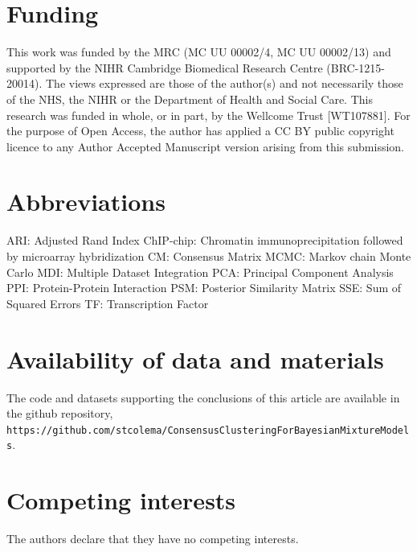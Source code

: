 \documentclass{bmcart}
\begin{document}
\begin{backmatter}
        
    \section*{Funding}%
    This work was funded by the MRC (MC UU 00002/4, MC UU 00002/13) and supported by the NIHR Cambridge Biomedical Research Centre (BRC-1215-20014). The views expressed are those of the author(s) and not necessarily those of the NHS, the NIHR or the Department of Health and Social Care. This research was funded in whole, or in part, by the Wellcome Trust [WT107881]. For the purpose of Open Access, the author has applied a CC BY public copyright licence to any Author Accepted Manuscript version arising from this submission.
    
    \section*{Abbreviations}%
    ARI: Adjusted Rand Index \newline 
    ChIP-chip: Chromatin immunoprecipitation followed by microarray hybridization \newline
    CM: Consensus Matrix \newline
    MCMC: Markov chain Monte Carlo \newline
    MDI: Multiple Dataset Integration \newline
    PCA: Principal Component Analysis \newline
    PPI: Protein-Protein Interaction \newline
    PSM: Posterior Similarity Matrix \newline
    SSE: Sum of Squared Errors \newline
    TF: Transcription Factor
    
    \section*{Availability of data and materials}%
    The code and datasets supporting the conclusions of this article are available in the github repository, \texttt{https://github.com/stcolema/ConsensusClusteringForBayesianMixtureModels}.

    \section*{Competing interests}
    The authors declare that they have no competing interests.
    

\end{backmatter}
\end{document}
